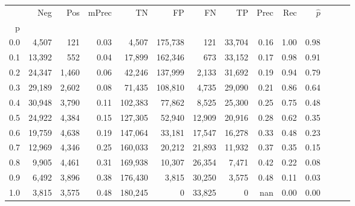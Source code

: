\begin{tabular}{rrrrrrrrrrrrrr}
\toprule
{} &     Neg &    Pos & mPrec &       TN &       FP &      FN &      TP &  Prec &   Rec & $\hat{p}$ \\
p   &         &        &       &          &          &         &         &       &       &           \\
\midrule
0.0 &   4,507 &    121 &  0.03 &    4,507 &  175,738 &     121 &  33,704 &  0.16 &  1.00 &      0.98 \\
0.1 &  13,392 &    552 &  0.04 &   17,899 &  162,346 &     673 &  33,152 &  0.17 &  0.98 &      0.91 \\
0.2 &  24,347 &  1,460 &  0.06 &   42,246 &  137,999 &   2,133 &  31,692 &  0.19 &  0.94 &      0.79 \\
0.3 &  29,189 &  2,602 &  0.08 &   71,435 &  108,810 &   4,735 &  29,090 &  0.21 &  0.86 &      0.64 \\
0.4 &  30,948 &  3,790 &  0.11 &  102,383 &   77,862 &   8,525 &  25,300 &  0.25 &  0.75 &      0.48 \\
0.5 &  24,922 &  4,384 &  0.15 &  127,305 &   52,940 &  12,909 &  20,916 &  0.28 &  0.62 &      0.35 \\
0.6 &  19,759 &  4,638 &  0.19 &  147,064 &   33,181 &  17,547 &  16,278 &  0.33 &  0.48 &      0.23 \\
0.7 &  12,969 &  4,346 &  0.25 &  160,033 &   20,212 &  21,893 &  11,932 &  0.37 &  0.35 &      0.15 \\
0.8 &   9,905 &  4,461 &  0.31 &  169,938 &   10,307 &  26,354 &   7,471 &  0.42 &  0.22 &      0.08 \\
0.9 &   6,492 &  3,896 &  0.38 &  176,430 &    3,815 &  30,250 &   3,575 &  0.48 &  0.11 &      0.03 \\
1.0 &   3,815 &  3,575 &  0.48 &  180,245 &        0 &  33,825 &       0 &   nan &  0.00 &      0.00 \\
\bottomrule
\end{tabular}
